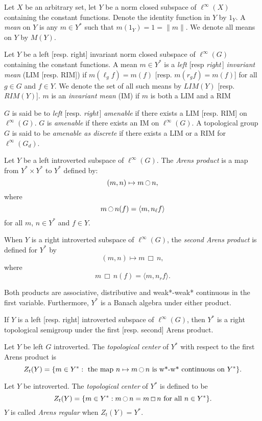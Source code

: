 \documentclass[landscape]{slides}
\begin{document}
\begin{slide}
Let $X$ be an arbitrary set, let $Y$ be a norm closed subspace of $\ell^\infty(X)$
containing the constant functions.
Denote the identity function in $Y$ by $1_Y$.
A {\it mean} on $Y$ is any $m\in Y^*$ such that $m(1_Y) = 1 = \|m\|$.
We denote all means on $Y$ by $M(Y)$.

Let $Y$ be a left [resp. right] invariant norm closed subspace of $\ell^\infty(G)$ containing the constant
functions.  A mean $m\in Y^*$ is a {\it left} [resp {\it right}\,] {\it invariant mean}
(LIM [resp. RIM]) if $m(\ell_g f) = m(f)$ [resp. $m(r_g f) = m(f)$] for all $g\in G$
and $f\in Y$. We denote the set of all such means by $LIM(Y)$ [resp. $RIM(Y)$].
$m$ is an {\it invariant mean} (IM) if $m$ is both a LIM and a RIM

$G$ is said be to {\it left} [resp. {\it right}\,] {\it amenable} if there exists a LIM [resp. RIM] on $\ell^\infty(G)$.
$G$ is {\it amenable} if there exists an IM on $\ell^\infty(G)$.
A topological group $G$ is said to be
{\it amenable as discrete} if there exists a LIM or a RIM for $\ell^\infty(G_d)$.
\end{slide}

\begin{slide}
Let $Y$ be a left introverted subspace of $\ell^\infty(G)$.
The {\it Arens product} is a map from $Y^* \times Y^*$ to $Y^*$ defined by:
\[
(m,n) \mapsto m\oodot n,
\]
where
\[
m\oodot n(f) = \langle m, n_\ell f\rangle
\]
for all $m$, $n\in Y^*$ and $f\in Y$.

When $Y$ is a right introverted subspace of $\ell^\infty(G)$,
the {\it second Arens product} is defined for $Y^*$ by
\[
(m,n) \mapsto m\,\Box\,n,
\]
where
\[
m\,\Box\,n(f) = \langle m, n_r f\rangle.
\]
\end{slide}

\begin{slide}
Both products are associative, distributive and weak*-weak* continuous
in the first variable.  Furthermore, $Y^*$ is a Banach algebra under either product.

If $Y$ is a left [resp. right] introverted subspace of $\ell^\infty(G)$, then
$Y^*$ is a right topological semigroup under the first [resp. second] Arens product.

Let $Y$ be left $G$ introverted.  The {\it topological center} of $Y^*$ with respect
to the first Arens product is
\[
Z_t(Y) = \{m\in Y^*:\text{ the map }n\mapsto m\oodot n\text{ is w*-w* continuous on }Y^*\}.
\]

Let $Y$ be introverted.  The {\it topological center} of $Y^*$ is defined to be
\[
Z_t(Y) = \{m\in Y^*:m\oodot n = m\,\Box\,n\text{ for all }n\in Y^*\}.
\]
$Y$ is called {\it Arens regular} when $Z_t(Y) = Y^*$.
\end{slide}
\end{document}

